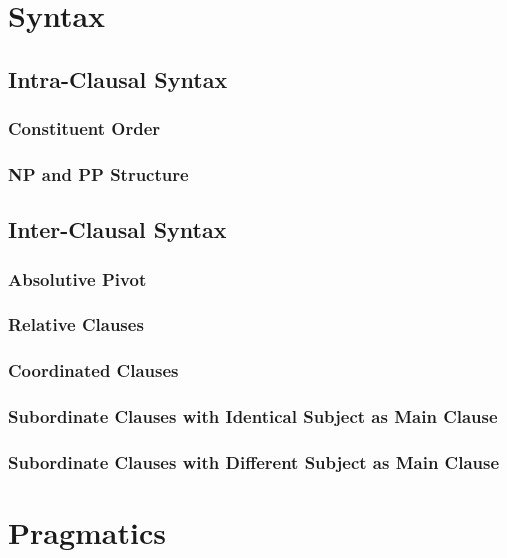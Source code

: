 \documentclass[paper=6in:9in, fontsize=10.5]{scrbook}
\newcommand{\ý}{ɨ́}
\begin{document}
{%
\chapter{Syntax}
\section{Intra-Clausal Syntax}
\subsection{Constituent Order}
\subsection{NP and PP Structure}

\section{Inter-Clausal Syntax}
\subsection{Absolutive Pivot} \label{ssec:pivot}
\subsection{Relative Clauses}
\subsection{Coordinated Clauses}
\subsection[S. Cl. with Identical Subject as Main Cl.]{Subordinate Clauses with Identical Subject as Main Clause}
\subsection[S. Cl. with Different Subject as Main Cl.]{Subordinate Clauses with Different Subject as Main Clause}

\chapter{Pragmatics}



\appendix
}
\end{document}
